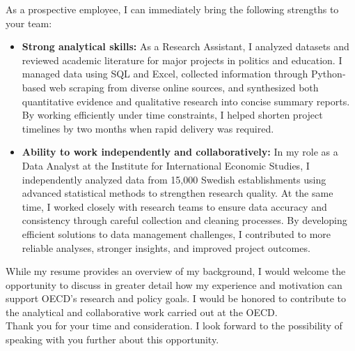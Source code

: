\documentclass[11pt,a4paper,roman]{moderncv}
\begin{document}
As a prospective employee, I can immediately bring the following strengths to your team:
\vspace{0.5em}
\begin{itemize}
\item \textbf{Strong analytical skills:} As a Research Assistant, I analyzed datasets and reviewed academic literature for major projects in politics and education. I managed data using SQL and Excel, collected information through Python-based web scraping from diverse online sources, and synthesized both quantitative evidence and qualitative research into concise summary reports. By working efficiently under time constraints, I helped shorten project timelines by two months when rapid delivery was required.
\item \textbf{Ability to work independently and collaboratively:} In my role as a Data Analyst at the Institute for International Economic Studies, I independently analyzed data from 15,000 Swedish establishments using advanced statistical methods to strengthen research quality. At the same time, I worked closely with research teams to ensure data accuracy and consistency through careful collection and cleaning processes. By developing efficient solutions to data management challenges, I contributed to more reliable analyses, stronger insights, and improved project outcomes.
\end{itemize}

\vspace{1em}
While my resume provides an overview of my background, I would welcome the opportunity to discuss in greater detail how my experience and motivation can support OECD's research and policy goals. I would be honored to contribute to the analytical and collaborative work carried out at the OECD.\\

\vspace{1em}
Thank you for your time and consideration. I look forward to the possibility of speaking with you further about this opportunity.

\vspace{0.5cm}


\makeletterclosing
\end{document}
